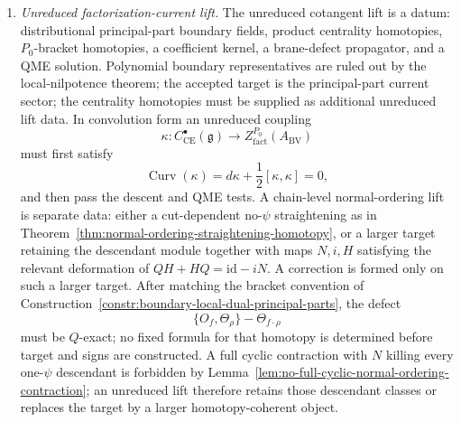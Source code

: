 \begin{enumerate}
  \item \emph{Unreduced factorization-current lift.}
  The unreduced cotangent lift is a datum:
  distributional principal-part boundary fields, product centrality
  homotopies, \(P_0\)-bracket homotopies, a coefficient kernel, a
  brane-defect propagator, and a QME solution.  Polynomial boundary
  representatives are ruled out by the local-nilpotence theorem; the
  accepted target is the principal-part current sector; the centrality
  homotopies must be supplied as additional unreduced lift data.  In
  convolution form an unreduced coupling
  \[
    \kappa\colon C^\bullet_{\mathrm{CE}}(\mathfrak g)
    \longrightarrow Z^{P_0}_{\mathrm{fact}}(A_{\mathrm{BV}})
  \]
  must first satisfy
  \[
    \operatorname{Curv}(\kappa)
    =d\kappa+\frac12[\kappa,\kappa]=0,
  \]
  and then pass the descent and QME tests.  A chain-level
  normal-ordering lift is separate data: either a cut-dependent
  no-\(\psi\) straightening as in
  Theorem~\ref{thm:normal-ordering-straightening-homotopy}, or a
  larger target retaining the descendant module together with maps
  \(N,i,H\) satisfying the relevant deformation of
  \(QH+HQ=\mathrm{id}-iN\).  A correction is formed only on such a
  larger target.  After matching the bracket convention of
  Construction~\ref{constr:boundary-local-dual-principal-parts}, the
  defect
  \[
    \{O_f,\Theta_\rho\}-\Theta_{f\cdot\rho}
  \]
  must be \(Q\)-exact; no fixed formula for that homotopy is
  determined before target and signs are constructed.  A full cyclic
  contraction with \(N\) killing every one-\(\psi\) descendant is
  forbidden by Lemma~\ref{lem:no-full-cyclic-normal-ordering-contraction};
  an unreduced lift therefore retains those descendant classes or
  replaces the target by a larger homotopy-coherent object.


\end{enumerate}
